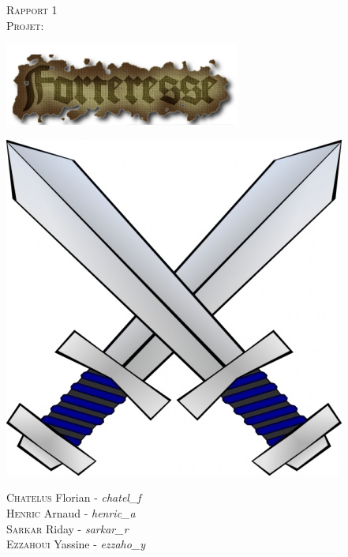 \documentclass[a4paper, 12pt]{article}
\begin{document}
\begin{titlepage}
  \begin{sffamily}
  \begin{center}


    \textsc{\Huge Rapport  1}\\[3cm]

    \textsc{\LARGE Projet:}\\[1.5cm]

	\centerline{\includegraphics{coollogo_com-19602433.png}}
	\vfill{
	\centerline{\includegraphics[scale=0.4]{crossed-swords-clip-art-48219.jpg}}}

    \begin{minipage}{0.4\textwidth}
      \begin{flushleft} \large	
      
      \end{flushleft}
    \end{minipage}
	\begin{flushleft}\vfill
      {
       \textsc{Chatelus} Florian - \emph{chatel\_f} \\
       \textsc{Henric} Arnaud - \emph{henric\_a}\\
       \textsc{Sarkar} Riday - \emph{sarkar\_r}\\
       \textsc{Ezzahoui} Yassine - \emph{ezzaho\_y} }
    \end{flushleft}	
  \end{center}
  \end{sffamily}
\end{titlepage}
\end{document}
